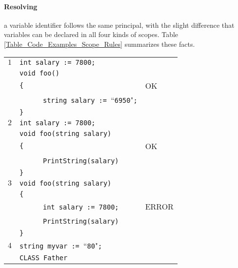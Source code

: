 \documentclass{article}
\begin{document}
\paragraph{Resolving} a variable identifier
follows the same principal, with the slight difference that variables can be declared
in all four kinds of scopes.
Table \ref{Table_Code_Examples_Scope_Rules} summarizes these facts.
\newpage
\begin{table}[h]
\centering
\begin{tabular}{|l|l|l|}
\hline
 $1$ & \verb"int salary := 7800;"                            &    \\
     & \verb"void foo()"                                     &    \\
     & \verb"{"                                              & OK \\
     & ~ ~ ~ ~\verb"string salary := "``\verb"6950""\verb";" &    \\
     & \verb"}"                                              &    \\
\hline
 $2$ & \verb"int salary := 7800;"        &    \\
     & \verb"void foo(string salary)"    &    \\
     & \verb"{"                          & OK \\
     & ~ ~ ~ ~\verb"PrintString(salary)" &    \\
     & \verb"}"                          &    \\
\hline
 $3$ & \verb"void foo(string salary)"    &       \\
     & \verb"{"                          &       \\
     & ~ ~ ~ ~\verb"int salary := 7800;" & ERROR \\
     & ~ ~ ~ ~\verb"PrintString(salary)" &       \\
     & \verb"}"                          &       \\
\hline
 $4$ & \verb"string myvar := "``\verb"80""\verb";" &    \\
     & \verb"CLASS Father"                         &    \\

\end{tabular}
\end{table}
\end{document}
